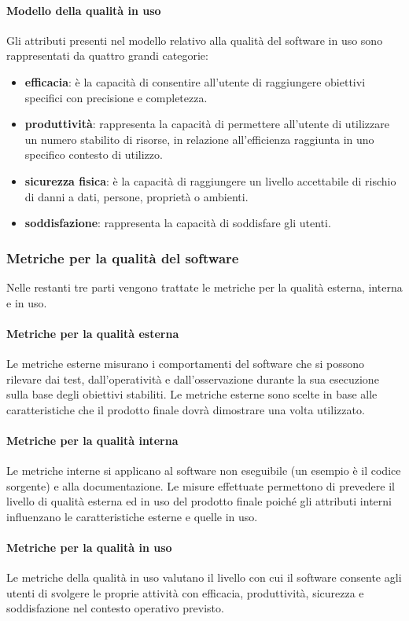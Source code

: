 			\paragraph{Modello della qualità in uso}
			Gli attributi presenti nel modello relativo alla qualità del software in uso sono rappresentati da quattro grandi categorie:
			\begin{itemize}
				\item \textbf{efficacia}: è la capacità di consentire all'utente di raggiungere obiettivi specifici con precisione e completezza.
				\item \textbf{produttività}: rappresenta la capacità di permettere all'utente di utilizzare un numero stabilito di risorse, in relazione all'efficienza raggiunta in uno specifico contesto di utilizzo.
				\item \textbf{sicurezza fisica}: è la capacità di raggiungere un livello accettabile di rischio di danni a dati, persone, proprietà o ambienti.
				\item \textbf{soddisfazione}: rappresenta la capacità di soddisfare gli utenti.
			\end{itemize}
		\subsubsection{Metriche per la qualità del software}
		Nelle restanti tre parti vengono trattate le metriche per la qualità esterna, interna e in uso.
			\paragraph{Metriche per la qualità esterna}
			Le metriche esterne misurano i comportamenti del software che si possono rilevare dai test, dall'operatività e dall'osservazione durante la sua esecuzione sulla base degli obiettivi stabiliti. Le metriche esterne sono scelte in base alle caratteristiche che il prodotto finale dovrà dimostrare una volta utilizzato.
			\paragraph{Metriche per la qualità interna}
			Le metriche interne si applicano al software non eseguibile (un esempio è il codice sorgente) e alla documentazione. Le misure effettuate permettono di prevedere il livello di qualità esterna ed in uso del prodotto finale poiché gli attributi interni influenzano le caratteristiche esterne e quelle in uso.
			\paragraph{Metriche per la qualità in uso}
			Le metriche della qualità in uso valutano il livello con cui il software consente agli utenti di svolgere le proprie attività con efficacia, produttività, sicurezza e soddisfazione nel contesto operativo previsto.
	
